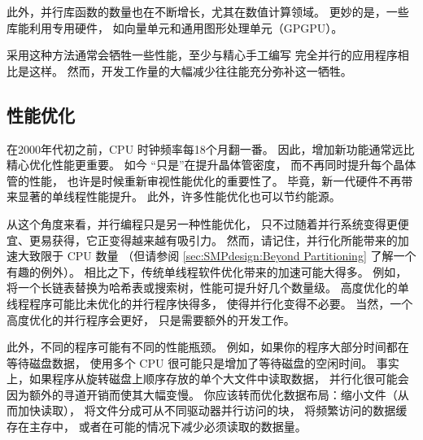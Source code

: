 此外，并行库函数的数量也在不断增长，尤其在数值计算领域。
更妙的是，一些库能利用专用硬件，
如向量单元和通用图形处理单元（GPGPU）。

采用这种方法通常会牺牲一些性能，至少与精心手工编写
完全并行的应用程序相比是这样。
然而，开发工作量的大幅减少往往能充分弥补这一牺牲。

\QuickQuizEnd

\subsection{性能优化}
\label{sec:intro:Performance Optimization}

在2000年代初之前，CPU 时钟频率每18个月翻一番。
因此，增加新功能通常远比精心优化性能更重要。
如今  ``只是''在提升晶体管密度，
而不再同时提升每个晶体管的性能，
也许是时候重新审视性能优化的重要性了。
毕竟，新一代硬件不再带来显著的单线程性能提升。
此外，许多性能优化也可以节约能源。

从这个角度来看，并行编程只是另一种性能优化，
只不过随着并行系统变得更便宜、更易获得，它正变得越来越有吸引力。
然而，请记住，并行化所能带来的加速大致限于 CPU 数量
（但请参阅 \cref{sec:SMPdesign:Beyond Partitioning}
了解一个有趣的例外）。
相比之下，传统单线程软件优化带来的加速可能大得多。
例如，将一个长链表替换为哈希表或搜索树，性能可提升好几个数量级。
高度优化的单线程程序可能比未优化的并行程序快得多，
使得并行化变得不必要。
当然，一个高度优化的并行程序会更好，
只是需要额外的开发工作。

此外，不同的程序可能有不同的性能瓶颈。
例如，如果你的程序大部分时间都在等待磁盘数据，
使用多个 CPU 很可能只是增加了等待磁盘的空闲时间。
事实上，如果程序从旋转磁盘上顺序存放的单个大文件中读取数据，
并行化很可能会因为额外的寻道开销而使其大幅变慢。
你应该转而优化数据布局：缩小文件（从而加快读取），
将文件分成可从不同驱动器并行访问的块，
将频繁访问的数据缓存在主存中，
或者在可能的情况下减少必须读取的数据量。

\QuickQuizEnd

